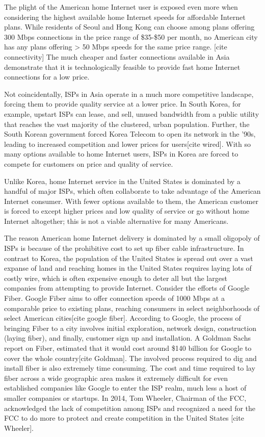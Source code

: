 \documentclass[pageno]{jpaper}
\begin{document}
The plight of the American home Internet user is exposed even more when considering the highest available home Internet speeds for affordable Internet plans. While residents of Seoul and Hong Kong can choose among plans offering 300 Mbps connections in the price range of \$35-\$50 per month, no American city has any plans offering > 50 Mbps speeds for the same price range. [cite connectivity] The much cheaper and faster connections available in Asia demonstrate that it is technologically feasible to provide fast home Internet connections for a low price. 

Not coincidentally, ISPs in Asia operate in a much more competitive landscape, forcing them to provide quality service at a lower price. In South Korea, for example, upstart ISPs can lease, and sell, unused bandwidth from a public utility that reaches the vast majority of the clustered, urban population. Further, the South Korean government forced Korea Telecom to open its network in the '90s, leading to increased competition and lower prices for users[cite wired]. With so many options available to home Internet users, ISPs in Korea are forced to compete for customers on price and quality of service.

Unlike Korea, home Internet service in the United States is dominated by a handful of  major ISPs, which often collaborate to take advantage of the American Internet consumer. With fewer options available to them, the American customer is forced to except higher prices and low quality of service or go without home Internet altogether; this is not a viable alternative for many Americans.

The reason American home Internet delivery is dominated by a small oligopoly of ISPs is because of the prohibitive cost to set up fiber cable infrastructure. In contrast to Korea, the population of the United States is spread out over a vast expanse of land and reaching homes in the United States requires laying lots of costly wire, which is often expensive enough to deter all but the largest companies from attempting to provide Internet. Consider the efforts of Google Fiber. Google Fiber aims to offer connection speeds of 1000 Mbps at a comparable price to existing plans, reaching consumers in select neighborhoods of select American cities[cite google fiber]. According to Google, the process of bringing Fiber to a city involves initial exploration, network design, construction (laying fiber), and finally, customer sign up and installation. A Goldman Sachs report on Fiber, estimated that it would cost around \$140 billion for Google to cover the whole country[cite Goldman]. The involved process required to dig and install fiber is also extremely time consuming. The cost and time required to lay fiber across a wide geographic area makes it extremely difficult for even established companies like Google to enter the ISP realm, much less a host of smaller companies or startups. In 2014, Tom Wheeler, Chairman of the FCC, acknowledged the lack of competition among ISPs and recognized a need for the FCC to do more to protect and create competition in the United States [cite Wheeler].
\end{document}

